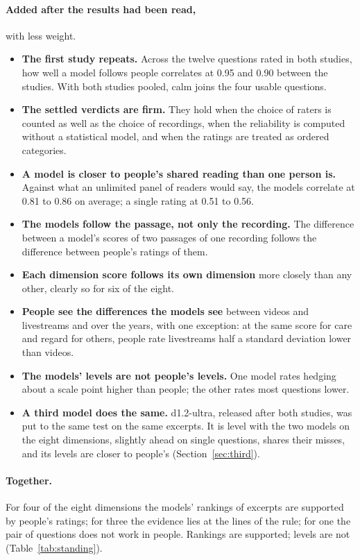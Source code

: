 \paragraph{Added after the results had been read,} with less weight.
\begin{itemize}
\item \textbf{The first study repeats.} Across the twelve questions rated in both studies, how well a model
  follows people correlates at 0.95 and 0.90 between the studies. With both studies pooled, calm joins the four
  usable questions.
\item \textbf{The settled verdicts are firm.} They hold when the choice of raters is counted as well as the
  choice of recordings, when the reliability is computed without a statistical model, and when the ratings are
  treated as ordered categories.
\item \textbf{A model is closer to people's shared reading than one person is.} Against what an unlimited panel
  of readers would say, the models correlate at 0.81 to 0.86 on average; a single rating at 0.51 to 0.56.
\item \textbf{The models follow the passage, not only the recording.} The difference between a model's scores
  of two passages of one recording follows the difference between people's ratings of them.
\item \textbf{Each dimension score follows its own dimension} more closely than any other, clearly so for six
  of the eight.
\item \textbf{People see the differences the models see} between videos and livestreams and over the years,
  with one exception: at the same score for care and regard for others, people rate livestreams half a standard
  deviation lower than videos.
\item \textbf{The models' levels are not people's levels.} One model rates hedging about a scale point higher
  than people; the other rates most questions lower.
\item \textbf{A third model does the same.} d1.2-ultra, released after both studies, was put to the same test
  on the same excerpts. It is level with the two models on the eight dimensions, slightly ahead on single
  questions, shares their misses, and its levels are closer to people's (Section~\ref{sec:third}).
\end{itemize}

\paragraph{Together.} For four of the eight dimensions the models' rankings of excerpts are supported by
people's ratings; for three the evidence lies at the lines of the rule; for one the pair of questions does not
work in people. Rankings are supported; levels are not (Table~\ref{tab:standing}).

